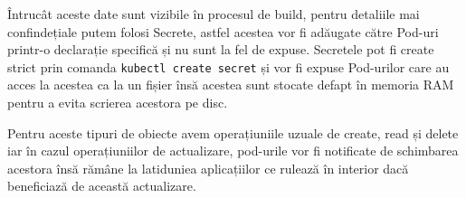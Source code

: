 Întrucât aceste date sunt vizibile în procesul de build, pentru detaliile 
mai confindețiale putem folosi Secrete, astfel acestea vor fi adăugate către Pod-uri 
printr-o declarație specifică și nu sunt la fel de expuse. Secretele pot fi create
strict prin comanda \verb|kubectl create secret| și vor fi expuse Pod-urilor care 
au acces la acestea ca la un fișier însă acestea sunt stocate defapt în memoria RAM 
pentru a evita scrierea acestora pe disc.

Pentru aceste tipuri de obiecte avem operațiuniile uzuale de create, read și delete
iar în cazul operațiuniilor de actualizare, pod-urile vor fi notificate de schimbarea
acestora însă rămâne la latiduniea aplicațiilor ce rulează în interior dacă beneficiază
de această actualizare.
